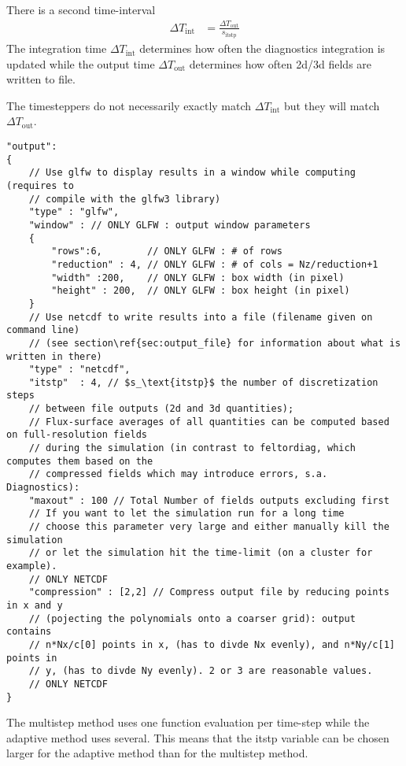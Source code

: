 There is a second time-interval
\begin{align}
    \Delta T_\text{int} &= \frac{\Delta T_\text{out} }{ s_\text{itstp}}
\end{align}
The integration time $\Delta T_\text{int}$ determines how often the diagnostics integration is updated
while the output time $\Delta T_\text{out}$ determines how often 2d/3d fields are written to file.
\begin{tcolorbox}[title=Note]
    The timesteppers do not necessarily exactly match
    $\Delta T_\text{int}$ but they will match $\Delta T_\text{out}$.
\end{tcolorbox}
\begin{verbatim}
"output":
{
    // Use glfw to display results in a window while computing (requires to
    // compile with the glfw3 library)
    "type" : "glfw",
    "window" : // ONLY GLFW : output window parameters
    {
        "rows":6,        // ONLY GLFW : # of rows
        "reduction" : 4, // ONLY GLFW : # of cols = Nz/reduction+1
        "width" :200,    // ONLY GLFW : box width (in pixel)
        "height" : 200,  // ONLY GLFW : box height (in pixel)
    }
    // Use netcdf to write results into a file (filename given on command line)
    // (see section\ref{sec:output_file} for information about what is written in there)
    "type" : "netcdf",
    "itstp"  : 4, // $s_\text{itstp}$ the number of discretization steps
    // between file outputs (2d and 3d quantities);
    // Flux-surface averages of all quantities can be computed based on full-resolution fields
    // during the simulation (in contrast to feltordiag, which computes them based on the
    // compressed fields which may introduce errors, s.a. Diagnostics):
    "maxout" : 100 // Total Number of fields outputs excluding first
    // If you want to let the simulation run for a long time
    // choose this parameter very large and either manually kill the simulation
    // or let the simulation hit the time-limit (on a cluster for example).
    // ONLY NETCDF
    "compression" : [2,2] // Compress output file by reducing points in x and y
    // (pojecting the polynomials onto a coarser grid): output contains
    // n*Nx/c[0] points in x, (has to divde Nx evenly), and n*Ny/c[1] points in
    // y, (has to divde Ny evenly). 2 or 3 are reasonable values.
    // ONLY NETCDF
}
\end{verbatim}
\begin{tcolorbox}[title=Note]
    The multistep method uses one function evaluation per time-step while the
    adaptive method uses several. This means that the itstp variable can
    be chosen larger for the adaptive method than for the multistep method.
\end{tcolorbox}


